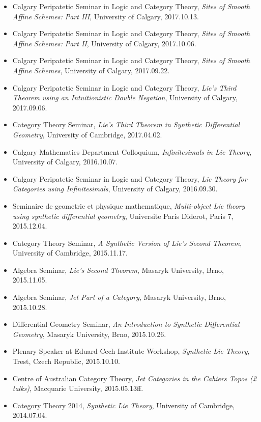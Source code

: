\documentclass[10pt]{article}
\begin{document}
\begin{itemize}
    \item Calgary Peripatetic Seminar in Logic and Category Theory, \emph{Sites of Smooth Affine Schemes: Part III}, University of Calgary, 2017.10.13.
    \item Calgary Peripatetic Seminar in Logic and Category Theory, \emph{Sites of Smooth Affine Schemes: Part II}, University of Calgary, 2017.10.06.
    \item Calgary Peripatetic Seminar in Logic and Category Theory, \emph{Sites of Smooth Affine Schemes}, University of Calgary, 2017.09.22.
    \item  Calgary Peripatetic Seminar in Logic and Category Theory, \emph{Lie's Third Theorem using an Intuitionistic Double Negation}, University of Calgary, 2017.09.06.
    \item Category Theory Seminar, \emph{Lie's Third Theorem in Synthetic Differential Geometry},  University of Cambridge, 2017.04.02.
    \item Calgary Mathematics Department Colloquium, \emph{Infinitesimals in Lie Theory}, University of Calgary, 2016.10.07.
    \item Calgary Peripatetic Seminar in Logic and Category Theory, \emph{Lie Theory for Categories using Infinitesimals}, University of Calgary, 2016.09.30.
    \item Seminaire de geometrie et physique mathematique, \emph{Multi-object Lie theory using synthetic differential geometry}, Universite Paris Diderot, Paris 7, 2015.12.04.
    \item Category Theory Seminar, \emph{A Synthetic Version of Lie's Second Theorem}, University of Cambridge, 2015.11.17.
    \item Algebra Seminar, \emph{Lie's Second Theorem}, Masaryk University, Brno, 2015.11.05.
    \item Algebra Seminar, \emph{Jet Part of a Category}, Masaryk University, Brno, 2015.10.28.
    \item Differential Geometry Seminar, \emph{An Introduction to Synthetic Differential Geometry}, Masaryk University, Brno, 2015.10.26.
    \item Plenary Speaker at Eduard Cech Institute Workshop, \emph{Synthetic Lie Theory}, Trest, Czech Republic, 2015.10.10.
    \item Centre of Australian Category Theory, \emph{Jet Categories in the Cahiers Topos (2 talks)}, Macquarie University, 2015.05.13ff.
    \item Category Theory 2014, \emph{Synthetic Lie Theory}, University of Cambridge, 2014.07.04.

\end{itemize}
\end{document}
